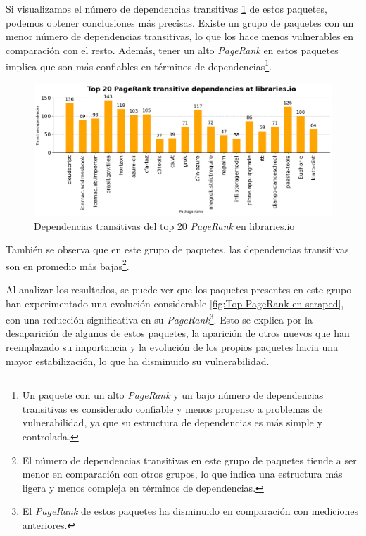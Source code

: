 Si visualizamos el número de dependencias transitivas \ref{fig:Dependencias transitivas del top 20 pagerank en libraries.io}
de estos paquetes, podemos obtener conclusiones más precisas.
Existe un grupo de paquetes con un menor número de dependencias transitivas, lo que los hace menos vulnerables en
comparación con el resto. Además, tener un alto \textit{PageRank} en estos paquetes implica que son más confiables
en términos de dependencias\footnote{Un paquete con un alto \textit{PageRank} y un bajo número de dependencias
    transitivas es considerado confiable y menos propenso a problemas de vulnerabilidad, ya que su estructura de
    dependencias es más simple y controlada.}.

\begin{figure}[h!]
    \begin{center}
        \includegraphics[width=1\textwidth]{img/pypi/transitive libraries.png}
        \caption{Dependencias transitivas del top 20 \textit{PageRank} en libraries.io}
        \label{fig:Dependencias transitivas del top 20 pagerank en libraries.io}
    \end{center}
\end{figure}

También se observa que en este grupo de paquetes, las dependencias transitivas son en promedio
más bajas\footnote{El número de dependencias transitivas en este grupo de paquetes tiende a
    ser menor en comparación con otros grupos, lo que indica una estructura más ligera y menos
    compleja en términos de dependencias.}.

Al analizar los resultados, se puede ver que los paquetes presentes en este grupo han
experimentado una evolución considerable \ref{fig:Top PageRank en scraped}, con una reducción significativa en
su \textit{PageRank}\footnote{El \textit{PageRank} de estos paquetes ha disminuido
    en comparación con mediciones anteriores.}. Esto se explica por la desaparición de algunos
de estos paquetes, la aparición de otros nuevos que han reemplazado su importancia y
la evolución de los propios paquetes hacia una mayor estabilización, lo que ha disminuido
su vulnerabilidad.

